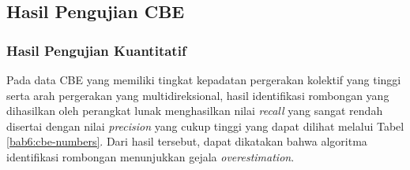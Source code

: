 \subsection{Hasil Pengujian CBE}
\label{subsec:cbe-result}

\subsubsection{Hasil Pengujian Kuantitatif}
\label{subsubsec:cbe-quantitative}

Pada data CBE yang memiliki tingkat kepadatan pergerakan kolektif yang tinggi serta arah pergerakan yang multidireksional, hasil identifikasi rombongan yang dihasilkan oleh perangkat lunak menghasilkan nilai \textit{recall} yang sangat rendah disertai dengan nilai \textit{precision} yang cukup tinggi yang dapat dilihat melalui Tabel \ref{bab6:cbe-numbers}. Dari hasil tersebut, dapat dikatakan bahwa algoritma identifikasi rombongan menunjukkan gejala \textit{overestimation}.


